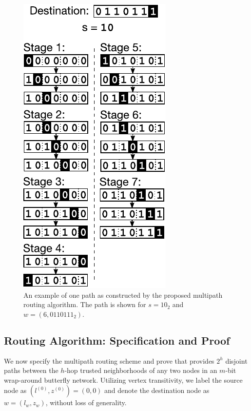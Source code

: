 \documentclass{sig-alternate-05-2015}
\begin{document}
\begin{figure}
\begin{center}
\includegraphics{fig-routing.pdf}
\end{center}
\caption{
An example of one path as constructed by the proposed multipath
routing algorithm.
The path is shown for $s = 10_2$
and $w = (6, 0110111_2)$.
\label{fig:routing}
}
\end{figure}

\subsection{Routing Algorithm: Specification and Proof}

We now specify the multipath routing scheme and prove
that provides $2^h$ disjoint paths between
the $h$-hop trusted neighborhoods of any two nodes in an $m$-bit
wrap-around butterfly network.
Utilizing vertex transitivity, we label the source node as
$(l^{(0)}, z^{(0)}) = (0, 0)$ and denote the destination node as $w = (l_w, z_w)$,
without loss of generality.
\end{document}
